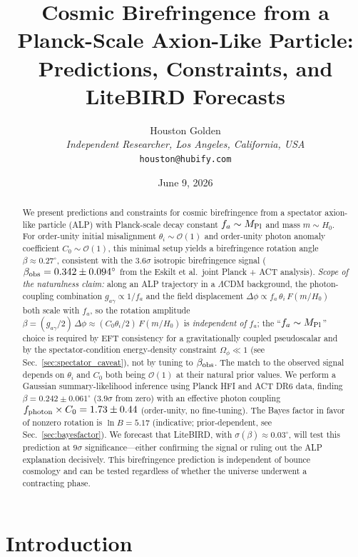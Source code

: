 \documentclass[a4paper,11pt]{article}
\title{Cosmic Birefringence from a Planck-Scale Axion-Like Particle:\\Predictions, Constraints, and LiteBIRD Forecasts}
\author{Houston Golden\\[4pt]
{\small\textit{Independent Researcher, Los Angeles, California, USA}}\\[2pt]
{\small\texttt{houston@hubify.com}}}
\date{June 9, 2026}
\begin{document}
\maketitle

\begin{abstract}
We present predictions and constraints for cosmic birefringence from a spectator axion-like particle (ALP) with Planck-scale decay constant $f_a \sim M_{\rm Pl}$ and mass $m \sim H_0$. For order-unity initial misalignment $\theta_i \sim \mathcal{O}(1)$ and order-unity photon anomaly coefficient $C_0 \sim \mathcal{O}(1)$, this minimal setup yields a birefringence rotation angle $\beta \approx 0.27^\circ$, consistent with the $3.6\sigma$ isotropic birefringence signal ($\beta_{\rm obs} = 0.342 \pm 0.094^\circ$ from the Eskilt et al.\ joint Planck + ACT analysis). \emph{Scope of the naturalness claim:} along an ALP trajectory in a $\Lambda$CDM background, the photon-coupling combination $g_{a\gamma} \propto 1/f_a$ and the field displacement $\Delta\phi \propto f_a\,\theta_i\,F(m/H_0)$ both scale with $f_a$, so the rotation amplitude $\beta = (g_{a\gamma}/2)\,\Delta\phi \approx (C_0\theta_i/2)\,F(m/H_0)$ is \emph{independent of $f_a$}; the ``$f_a\sim M_{\rm Pl}$'' choice is required by EFT consistency for a gravitationally coupled pseudoscalar and by the spectator-condition energy-density constraint $\Omega_\phi\!\ll\!1$ (see Sec.~\ref{sec:spectator_caveat}), not by tuning to $\beta_{\rm obs}$. The match to the observed signal depends on $\theta_i$ and $C_0$ both being $\mathcal{O}(1)$ at their natural prior values. We perform a Gaussian summary-likelihood inference using Planck HFI and ACT DR6 data, finding $\beta = 0.242 \pm 0.061^\circ$ ($3.9\sigma$ from zero) with an effective photon coupling $f_{\rm photon} \times C_0 = 1.73 \pm 0.44$ (order-unity, no fine-tuning). The Bayes factor in favor of nonzero rotation is $\ln B = 5.17$ (indicative; prior-dependent, see Sec.~\ref{sec:bayesfactor}). We forecast that LiteBIRD, with $\sigma(\beta) \approx 0.03^\circ$, will test this prediction at $9\sigma$ significance---either confirming the signal or ruling out the ALP explanation decisively. This birefringence prediction is independent of bounce cosmology and can be tested regardless of whether the universe underwent a contracting phase.
\end{abstract}

\section{Introduction}
\end{document}
